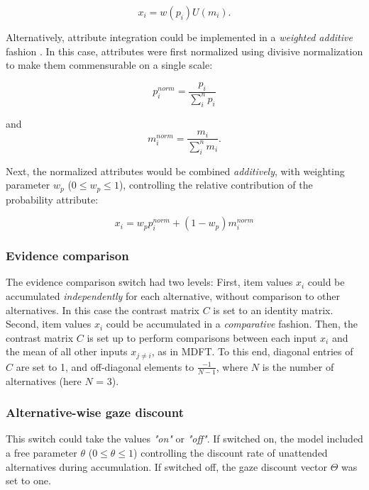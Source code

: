 \documentclass[11pt, a4paper]{article}
\begin{document}
\begin{equation}
x_i = w(p_i) U(m_i).
\end{equation}

Alternatively, attribute integration could be implemented in a \emph{weighted additive} fashion \autocite[]{rouault2019PrefrontalMechanismsCombining}. In this case, attributes were first normalized using divisive normalization \autocite{louie2013NormalizationGeneralNeural} to make them commensurable on a single scale:

\begin{equation}
p^{norm}_i = \frac{p_i}{\sum_i^n{p_i}}
\end{equation}

and
\begin{equation}
m^{norm}_i = \frac{m_i}{\sum_i^n{m_i}}.
\end{equation}

Next, the normalized attributes would be combined \emph{additively}, with weighting parameter $w_p$ ($0 \le w_p \le 1$), controlling the relative contribution of the probability attribute:

\begin{equation}
x_i = w_p p^{norm}_i + (1 - w_p) m^{norm}_i
\end{equation}

\subsubsection*{Evidence comparison}
The evidence comparison switch had two levels: First, item values $x_i$ could be accumulated \emph{independently} for each alternative, without comparison to other alternatives. In this case the contrast matrix $C$ is set to an identity matrix. Second, item values $x_i$ could be accumulated in a \emph{comparative} fashion. Then, the contrast matrix $C$ is set up to perform comparisons between each input $x_i$ and the mean of all other inputs $x_{j \ne i}$, as in MDFT. To this end, diagonal entries of $C$ are set to 1, and off-diagonal elements to $\frac{-1}{N-1}$, where $N$ is the number of alternatives (here $N$ = 3).

\subsubsection*{Alternative-wise gaze discount}
This switch could take the values \emph{"on"} or \emph{"off"}. If switched on, the model included a free parameter $\theta$ ($0 \le \theta \le 1$) controlling the discount rate of unattended alternatives during accumulation. If switched off, the gaze discount vector $\Theta$ was set to one.
\end{document}
